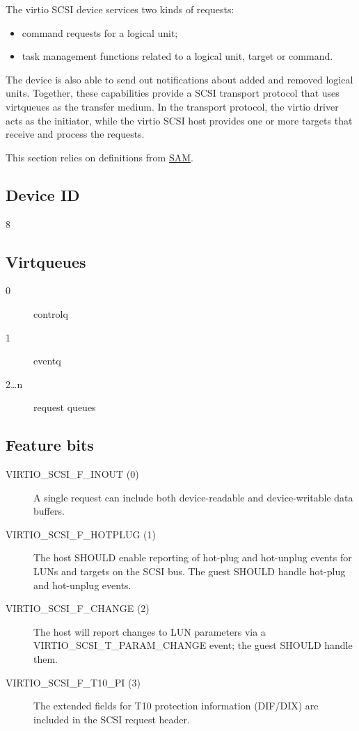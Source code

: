 The virtio SCSI device services two kinds of requests:
\begin{itemize}
\item command requests for a logical unit;

\item task management functions related to a logical unit, target or
  command.
\end{itemize}

The device is also able to send out notifications about added and
removed logical units. Together, these capabilities provide a
SCSI transport protocol that uses virtqueues as the transfer
medium. In the transport protocol, the virtio driver acts as the
initiator, while the virtio SCSI host provides one or more
targets that receive and process the requests.

This section relies on definitions from \hyperref[intro:SAM]{SAM}.

\subsection{Device ID}\label{sec:Device Types / SCSI Host Device / Device ID}
  8

\subsection{Virtqueues}\label{sec:Device Types / SCSI Host Device / Virtqueues}

\begin{description}
\item[0] controlq
\item[1] eventq
\item[2\ldots n] request queues
\end{description}

\subsection{Feature bits}\label{sec:Device Types / SCSI Host Device / Feature bits}

\begin{description}
\item[VIRTIO_SCSI_F_INOUT (0)] A single request can include both
    device-readable and device-writable data buffers.

\item[VIRTIO_SCSI_F_HOTPLUG (1)] The host SHOULD enable reporting of
    hot-plug and hot-unplug events for LUNs and targets on the SCSI bus.
    The guest SHOULD handle hot-plug and hot-unplug events.

\item[VIRTIO_SCSI_F_CHANGE (2)] The host will report changes to LUN
    parameters via a VIRTIO_SCSI_T_PARAM_CHANGE event; the guest
    SHOULD handle them.

\item[VIRTIO_SCSI_F_T10_PI (3)] The extended fields for T10 protection
    information (DIF/DIX) are included in the SCSI request header.
\end{description}

